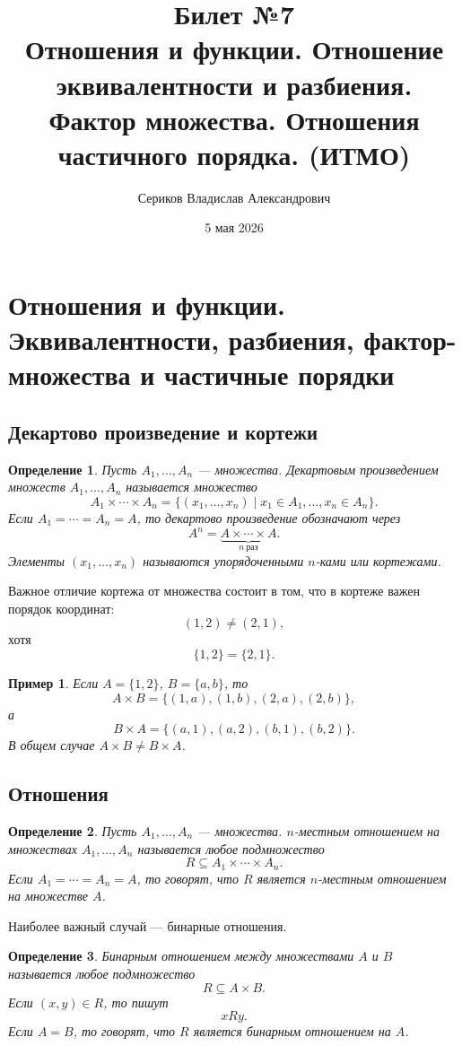 \documentclass[12pt,a4paper]{article}
\title{Билет №7 \\ \small Отношения и функции. Отношение эквивалентности и разбиения. Фактор множества. Отношения частичного порядка. (ИТМО)}
\author{Сериков Владислав Александрович}
\date{5 мая 2026}
\newtheorem{definition}{Определение}
\newtheorem{example}{Пример}
\begin{document}
\maketitle
\tableofcontents
\newpage

\section{Отношения и функции. Эквивалентности, разбиения, фактор-множества и частичные порядки}

\subsection{Декартово произведение и кортежи}

\begin{definition}
Пусть $A_1,\dots,A_n$ --- множества. \emph{Декартовым произведением}
множеств $A_1,\dots,A_n$ называется множество
\[
A_1\times\cdots\times A_n
=
\{(x_1,\dots,x_n)\mid x_1\in A_1,\dots,x_n\in A_n\}.
\]
Если $A_1=\cdots=A_n=A$, то декартово произведение обозначают через
\[
A^n=\underbrace{A\times\cdots\times A}_{n\ \text{раз}}.
\]
Элементы $(x_1,\dots,x_n)$ называются \emph{упорядоченными $n$-ками}
или \emph{кортежами}.
\end{definition}

Важное отличие кортежа от множества состоит в том, что в кортеже важен порядок координат:
\[
(1,2)\ne (2,1),
\]
хотя
\[
\{1,2\}=\{2,1\}.
\]

\begin{example}
Если $A=\{1,2\}$, $B=\{a,b\}$, то
\[
A\times B=\{(1,a),(1,b),(2,a),(2,b)\},
\]
а
\[
B\times A=\{(a,1),(a,2),(b,1),(b,2)\}.
\]
В общем случае $A\times B\ne B\times A$.
\end{example}

\subsection{Отношения}

\begin{definition}
Пусть $A_1,\dots,A_n$ --- множества. \emph{$n$-местным отношением}
на множествах $A_1,\dots,A_n$ называется любое подмножество
\[
R\subseteq A_1\times\cdots\times A_n.
\]
Если $A_1=\cdots=A_n=A$, то говорят, что $R$ является $n$-местным отношением
на множестве $A$.
\end{definition}

Наиболее важный случай --- бинарные отношения.

\begin{definition}
\emph{Бинарным отношением} между множествами $A$ и $B$ называется любое подмножество
\[
R\subseteq A\times B.
\]
Если $(x,y)\in R$, то пишут
\[
xRy.
\]
Если $A=B$, то говорят, что $R$ является бинарным отношением на $A$.
\end{definition}
\end{document}
